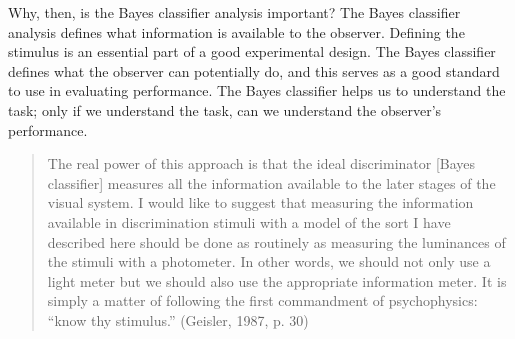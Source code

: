 Why, then, is the Bayes classifier analysis important?  The Bayes
classifier analysis defines what information is available to the
observer.  Defining the stimulus is an essential part of a good
experimental design.  The Bayes classifier defines what the observer
can potentially do, and this serves as a good standard to use in
evaluating performance.  The Bayes classifier helps us to understand
the task; only if we understand the task, can we understand the
observer's performance.

\begin{quote}  
The real power of this approach is that the ideal discriminator [Bayes
classifier] measures all the information available to the later stages
of the visual system.  I would like to suggest that measuring the
information available in discrimination stimuli with a model of the
sort I have described here should be done as routinely as measuring
the luminances of the stimuli with a photometer.  In other words, we
should not only use a light meter but we should also use the
appropriate information meter.  It is simply a matter of following the
first commandment of psychophysics: ``know thy stimulus.''  (Geisler,
1987, p. 30)
\end{quote}

